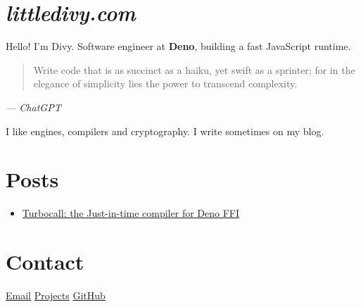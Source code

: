 \documentclass[11pt]{article}
\begin{document}
\vspace{30pt}

\section*{\textit{littledivy.com}}

Hello! I'm Divy. Software engineer at \textbf{Deno}, building a fast JavaScript runtime.

\begin{quote}
Write code that is as succinct as a haiku, yet swift as a sprinter; for in the elegance of simplicity lies the power to transcend complexity.
\end{quote}
\begin{flushright}\textit{--- ChatGPT}\end{flushright}

I like engines, compilers and cryptography. I write sometimes on my blog.

\section*{Posts}

\begin{itemize}
	\item \href{/turbocall.html}{Turbocall: the Just-in-time compiler for Deno FFI}
\end{itemize}

\section*{Contact}

\href{mailto:dj.srivastava23@gmail.com}{Email}
\href{https://github.com/littledivy?tab=repositories}{Projects}
\href{https://github.com/littledivy}{GitHub}
\end{document}
